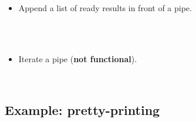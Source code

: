 \documentclass{beamer}
\newcommand{\tmstrong}[1]{\textbf{#1}}
\begin{document}
\begin{itemize}
  \item Append a list of ready results in front of a pipe.
  
  {}{}{\hlopt{=}}{\hlendline{}}\\
  {\hlstd{ \ }}{}{}{}{\hlendline{}}\\
  {\hlstd{ \ }}{\hlopt{\textbar  [] -> }}{}{\hlopt{::}}{}{\hlopt{-> }}{}{\hlopt{(}}{}{\hlopt{, }}{}{\hlopt{)}}{\hlendline{}}
  
  \item Iterate a pipe ({\tmstrong{not functional}}).
  
  {}{}{\hlopt{: }}{}{\hlopt{=}}{\hlendline{}}\\
  {\hlstd{ \ }}{}{\hlopt{(}}{}{}{\hlopt{->
  }}{}{\hlopt{() = }}{}{}{}{\hlopt{)}}{\hlendline{}}
\end{itemize}

\subsection{Example: pretty-printing}
\end{document}
